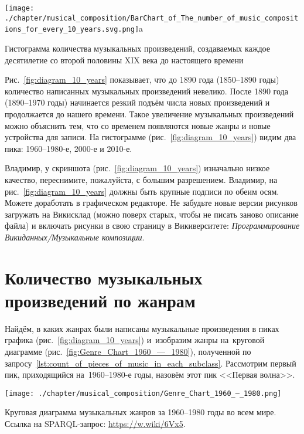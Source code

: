 \begin{marginfigure}[-5\baselineskip]
    \texttt{[image: ./chapter/musical\_composition/BarChart\_of\_The\_number\_of\_music\_compositions\_for\_every\_10\_years.svg.png]}a
    \vspace{-7pt}
	\caption{Гистограмма количества музыкальных произведений, 
             создаваемых каждое десятилетие со второй половины XIX века до настоящего времени}%
	\label{fig:diagram_10_years}%
\end{marginfigure}
%
Рис.~\ref{fig:diagram_10_years} показывает, что до 1890 года (1850--1890 годы) 
количество написанных музыкальных произведений невелико. 
После 1890 года (1890--1970 годы) начинается резкий подъём числа новых произведений 
и продолжается до нашего времени. 
Такое увеличение музыкальных произведений можно объяснить тем, 
что со временем появляются новые жанры и новые устройства для записи. 
На гистограмме (рис.~\ref{fig:diagram_10_years}) видим два пика: 1960--1980-е, 2000-е и 2010-е.

\TODO Владимир, у скриншота (рис.~\ref{fig:diagram_10_years}) изначально низкое качество, 
переснимите, пожалуйста, с большим разрешением. 
Владимир, 
на рис.~\ref{fig:diagram_10_years} должны быть крупные подписи по обеим осям. 
Можете доработать в графическом редакторе. 
Не забудьте новые версии рисунков загружать на Викисклад 
(можно поверх старых, чтобы не писать заново описание файла) 
и включать рисунки в свою страницу в Викиверситете: 
\textit{Программирование Викиданных/Музыкальные композиции}. 






\newpage
\section{Количество музыкальных произведений по жанрам}

Найдём, в каких жанрах были написаны музыкальные произведения 
в пиках графика (рис.~\ref{fig:diagram_10_years}) 
и~изобразим жанры на~круговой диаграмме (рис.~\ref{fig:Genre_Chart_1960_—_1980}), 
полученной по запросу~\ref{lst:count_of_pieces_of_music_in_each_subclass}. 
Рассмотрим первый пик, приходящийся на~1960--1980-е годы, назовём этот пик <<Первая волна>>.

\begin{marginfigure}[0\baselineskip]
	\texttt{[image: ./chapter/musical\_composition/Genre\_Chart\_1960\_—\_1980.png]}
	\caption[Круговая диаграмма музыкальных жанров за 1960--1980 годы во всем мире]{Круговая диаграмма музыкальных жанров за 1960--1980 годы во всем мире. Ссылка на SPARQL-запрос: \href{https://w.wiki/6Vx5}{https://w.wiki/6Vx5}.}%
	\label{fig:Genre_Chart_1960_—_1980}%
\end{marginfigure}

